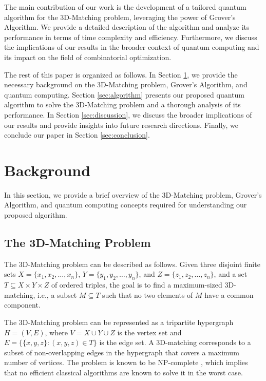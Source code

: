 The main contribution of our work is the development of a tailored quantum algorithm for the 3D-Matching problem, leveraging the power of Grover's Algorithm. We provide a detailed description of the algorithm and analyze its performance in terms of time complexity and efficiency. Furthermore, we discuss the implications of our results in the broader context of quantum computing and its impact on the field of combinatorial optimization.

The rest of this paper is organized as follows. In Section \ref{sec:background}, we provide the necessary background on the 3D-Matching problem, Grover's Algorithm, and quantum computing. Section \ref{sec:algorithm} presents our proposed quantum algorithm to solve the 3D-Matching problem and a thorough analysis of its performance. In Section \ref{sec:discussion}, we discuss the broader implications of our results and provide insights into future research directions. Finally, we conclude our paper in Section \ref{sec:conclusion}.

\section{Background}\label{sec:background}

In this section, we provide a brief overview of the 3D-Matching problem, Grover's Algorithm, and quantum computing concepts required for understanding our proposed algorithm.

\subsection{The 3D-Matching Problem}

The 3D-Matching problem can be described as follows. Given three disjoint finite sets $X = \{x_1, x_2, \dots, x_n\}$, $Y = \{y_1, y_2, \dots, y_n\}$, and $Z = \{z_1, z_2, \dots, z_n\}$, and a set $T \subseteq X \times Y \times Z$ of ordered triples, the goal is to find a maximum-sized 3D-matching, i.e., a subset $M \subseteq T$ such that no two elements of $M$ have a common component.

The 3D-Matching problem can be represented as a tripartite hypergraph $H = (V, E)$, where $V = X \cup Y \cup Z$ is the vertex set and $E = \{\{x, y, z\} : (x, y, z) \in T\}$ is the edge set. A 3D-matching corresponds to a subset of non-overlapping edges in the hypergraph that covers a maximum number of vertices. The problem is known to be NP-complete \cite{garey1979computers}, which implies that no efficient classical algorithms are known to solve it in the worst case.

